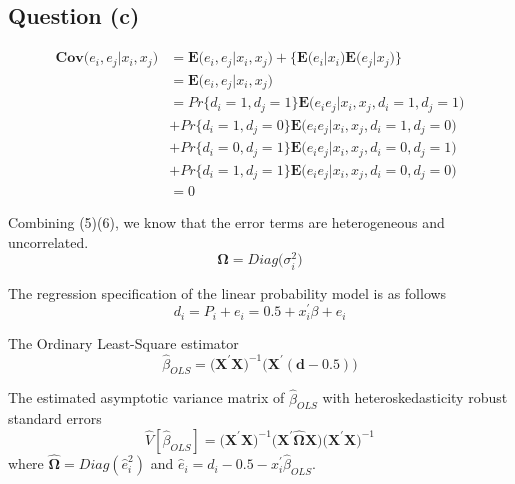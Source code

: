 \documentclass{article}
\begin{document}
\subsection*{Question (c)}

\begin{equation}
\begin{split}
\pmb{Cov}\bigg(e_i, e_j \bigg| x_i, x_j \bigg) & = \pmb{E} \bigg(e_i, e_j \bigg| x_i, x_j \bigg) + \Bigg\{ \pmb{E} \bigg(e_i \bigg| x_i\bigg) \pmb{E} \bigg(e_j \bigg| x_j \bigg) \Bigg\}\\
& = \pmb{E} \bigg(e_i, e_j \bigg| x_i, x_j \bigg) \\
& = Pr\bigg\{ d_i = 1, d_j = 1 \bigg\} \pmb{E}\bigg(e_i e_j \bigg| x_i, x_j, d_i = 1, d_j = 1 \bigg) \\ 
& + Pr\bigg\{ d_i = 1, d_j = 0 \bigg\} \pmb{E}\bigg(e_i e_j \bigg| x_i, x_j, d_i = 1, d_j = 0 \bigg) \\
& + Pr\bigg\{ d_i = 0, d_j = 1 \bigg\} \pmb{E}\bigg(e_i e_j \bigg| x_i, x_j, d_i = 0, d_j = 1 \bigg) \\
& + Pr\bigg\{ d_i = 1, d_j = 1 \bigg\} \pmb{E}\bigg(e_i e_j \bigg| x_i, x_j, d_i = 0, d_j = 0 \bigg) \\
& = 0
\end{split}
\end{equation}

Combining (5)(6), we know that the error terms are heterogeneous and uncorrelated. 
\begin{equation}
\pmb{\Omega} = Diag\bigg(\sigma_i^2 \bigg)
\end{equation}

\addtolength{\jot}{-3pt}
The regression specification of the linear probability model is as follows
\begin{equation*}
d_i = P_i + e_i = 0.5 + x_i^\prime \beta + e_i
\end{equation*}

The Ordinary Least-Square estimator
\begin{equation*}
\hat{\beta}_{OLS} = \bigg(\pmb{X}^\prime \pmb{X} \bigg)^{-1} \bigg(\pmb{X}^\prime (\pmb{d - 0.5} ) \bigg)
\end{equation*}

The estimated asymptotic variance matrix of $\hat \beta_{OLS}$ with heteroskedasticity robust standard errors 
\begin{equation}
\hat V [\hat \beta_{OLS}] = \bigg(\pmb{X}^\prime \pmb{X}\bigg)^{-1} \bigg(\pmb{X}^\prime \pmb{\hat \Omega} \pmb{X} \bigg)  \bigg(\pmb{X}^\prime \pmb{X}\bigg)^{-1}
\end{equation}
where $\pmb{\hat \Omega} = Diag(\hat e_i^2)$ and $\hat e_i = d_i - 0.5 - x_i^\prime \hat \beta_{OLS}$. 
\end{document}
